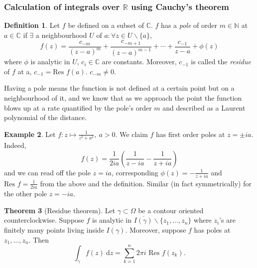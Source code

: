 \documentclass[a4paper]{article}
\theoremstyle{definition}
\newtheorem{defn}{Definition}[subsection]
\newtheorem{thm}[defn]{Theorem}
\newtheorem{example}[defn]{Example}
\begin{document}
\subsubsection{Calculation of integrals over $\mathbb R$ using Cauchy's theorem}
\begin{defn}
Let $f$ be defined on a subset of $\mathbb C$. $f$ has a \textit{pole} of order $m\in \mathbb N$ at $a\in \mathbb C$ if $\exists$ a neighbourhood $U$ of $a:\forall z\in U\backslash \{a\}$,
\[
f(z) = \frac{c_{-m}}{(z-a)^m}+\frac{c_{-m+1}}{(z-a)^{m-1}}+\cdots+\frac{c_{-1}}{z-a}+\phi(z)
\]
where $\phi$ is analytic in $U$, $c_i \in \mathbb C$ are constants. Moreover, $c_{-1}$ is called the \textit{residue} of $f$ at a, $c_{-1}=\text{Res }f(a)$. $c_{-m} \neq 0$.
\end{defn}
Having a pole means the function is not defined at a certain point but on a neighbourhood of it, and we know that as we approach the point the function blows up at a rate quantified by the pole's order $m$ and described as a Laurent polynomial of the distance.
\begin{example}
Let $f:z\mapsto \frac{1}{z^2+a^2},\ a>0$. We claim $f$ has first order poles at $z=\pm ia$. Indeed,
\[
f(z) = \frac{1}{2i a } \left(\frac{1}{z-ia}-\frac{1}{z+ia} \right)
\]
and we can read off the pole $z=ia$, corresponding $\phi(z)=-\frac{1}{z+ia}$ and $\text{Res }f=\frac{1}{2ia}$ from the above and the definition. Similar (in fact symmetrically) for the other pole $z=-ia$.
\end{example}
\begin{thm}[Residue theorem]
Let $\gamma \subset \Omega$ be a contour oriented counterclockwise. Suppose $f$ is analytic in $\overline{I(\gamma)}\backslash \{z_1,\ldots,z_n\}$ where $z_i$'s are finitely many points living inside $I(\gamma)$. Moreover, suppose $f$ has poles at $z_1,\ldots,z_n$. Then
\[
\int_\gamma f(z) \ \mathrm d z = \sum_{k=1}^n 2\pi i \text{ Res } f(z_k).
\]
\end{thm}
\end{document}
